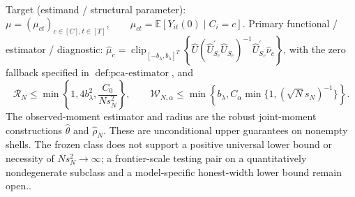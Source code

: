 \documentclass{article}
\begin{document}
Target (estimand / structural parameter): \(\mu=(\mu_{ct})_{c\in[C],t\in[T]},\qquad \mu_{ct}=\mathbb E[Y_{it}(0)\mid C_i=c]\).
Primary functional / estimator / diagnostic: \(\widehat\mu_c=\operatorname{clip}_{[-b_\lambda,b_\lambda]^T}\!\left\{\widehat U(\widehat U_{S_c}^{\prime}\widehat U_{S_c})^{-1}\widehat U_{S_c}^{\prime}\widehat\nu_c\right\}\), with the zero fallback specified in \(\operatorname{def:pca\text{-}estimator}\), and \[\mathcal R_N\leq\min\!\left\{1,4b_\lambda^2,\frac{C_0}{Ns_N^2}\right\},\qquad \mathcal W_{N,\alpha}\leq\min\!\left\{b_\lambda,C_\alpha\min\{1,(\sqrt N s_N)^{-1}\}\right\}.\] The observed-moment estimator and radius are the robust joint-moment constructions \(\widehat\theta\) and \(\widehat\rho_N\). These are unconditional upper guarantees on nonempty shells. The frozen class does not support a positive universal lower bound or necessity of \(Ns_N^2\to\infty\); a frontier-scale testing pair on a quantitatively nondegenerate subclass and a model-specific honest-width lower bound remain open..
\end{document}

